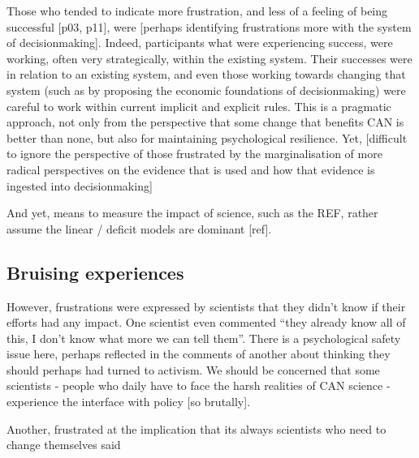 Those who tended to indicate more frustration, and less of a feeling of being successful [p03, p11], were [perhaps identifying frustrations more with the system of decisionmaking]. Indeed, participants what were experiencing success, were working, often very strategically, within the existing system. Their successes were in relation to an existing system, and even those working towards changing that system (such as by proposing the economic foundations of decisionmaking) were careful to work within current implicit and explicit rules. This is a pragmatic approach, not only from the perspective that some change that benefits CAN is better than none, but also for maintaining psychological resilience. Yet, [difficult to ignore the perspective of those frustrated by the marginalisation of more radical perspectives on the evidence that is used and how that evidence is ingested into decisionmaking]  

And yet, means to measure the impact of science, such as the REF, rather assume the linear / deficit models are dominant [ref]. 

\subsection{Bruising experiences}\label{sec:disbruise}
However, frustrations were expressed by scientists that they didn't know if their efforts had any impact. One scientist even commented ``they already know all of this, I don't know what more we can tell them''. There is a psychological safety issue here, perhaps reflected in the comments of another about thinking they should perhaps had turned to activism. We should be concerned that some scientists - people who daily have to face the harsh realities of CAN science - experience the interface with policy [so brutally].

Another, frustrated at the implication that its always scientists who need to change themselves said 

